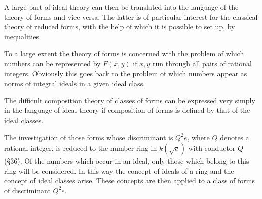 A large part of ideal theory can then be translated into the language of the theory of forms and vice versa. The latter is of particular interest for the classical theory of reduced forms, with the help of which it is possible to set up, by inequalities

To a large extent the theory of forms is concerned with the problem of which numbers can be represented by $F(x, y)$ if $x, y$ run through all pairs of rational integers. Obviously this goes back to the problem of which numbers appear as norms of integral ideals in a given ideal class.

The difficult composition theory of classes of forms can be expressed very simply in the language of ideal theory if composition of forms is defined by that of the ideal classes.

The investigation of those forms whose discriminant is $Q^2 e$, where $Q$ denotes a rational integer, is reduced to the number ring in $k(\sqrt{e})$ with conductor $Q$ (§36). Of the numbers which occur in an ideal, only those which belong to this ring will be considered. In this way the concept of ideals of a ring and the concept of ideal classes arise. These concepts are then applied to a class of forms of discriminant $Q^2 e$.

